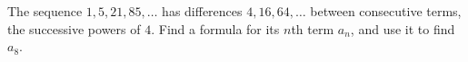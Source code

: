 The sequence $1,5,21,85,\dots$ has differences $4,16,64,\dots$ between consecutive terms, the successive powers of $4$. Find a formula for its $n$th term $a_n$, and use it to find $a_{8}$.

